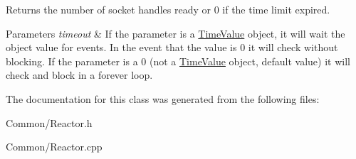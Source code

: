 Returns the number of socket handles ready or 0 if the time limit expired. 


\begin{DoxyParams}{Parameters}
{\em timeout} & If the parameter is a \hyperlink{class_common_1_1_time_value}{Time\-Value} object, it will wait the object value for events. In the event that the value is 0 it will check without blocking. If the parameter is a 0 (not a \hyperlink{class_common_1_1_time_value}{Time\-Value} object, default value) it will check and block in a forever loop. \\
\hline
\end{DoxyParams}


The documentation for this class was generated from the following files\-:\begin{DoxyCompactItemize}
\item 
Common/Reactor.\-h\item 
Common/Reactor.\-cpp\end{DoxyCompactItemize}
